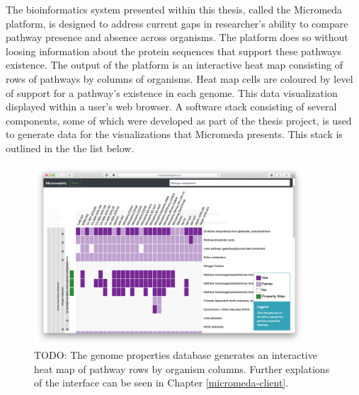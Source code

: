 The bioinformatics system presented within this thesis, called the Micromeda platform, is designed to address current gaps in researcher's ability to compare pathway presence and absence across organisms. The platform does so without loosing information about the protein sequences that support these pathways existence. The output of the platform is an interactive heat map consisting of rows of pathways by columns of organisms. Heat map cells are coloured by level of support for a pathway's existence in each genome. This data visualization displayed within a user's web browser. A software stack consisting of several components, some of which were developed as part of the thesis project, is used to generate data for the visualizations that Micromeda presents. This stack is outlined in the the list below.

\begin{figure}[!ht]
  \centering
	\includegraphics[width=0.9\textwidth]{media/Micromeda-Simple-Overview.png}
	 \caption{TODO: The genome properties database generates an interactive heat map of pathway rows by organism columns. Further explations of the interface can be seen in Chapter \ref{micromeda-client}.}
	 \label{fig:basic-heatmap-overview}
\end{figure}

